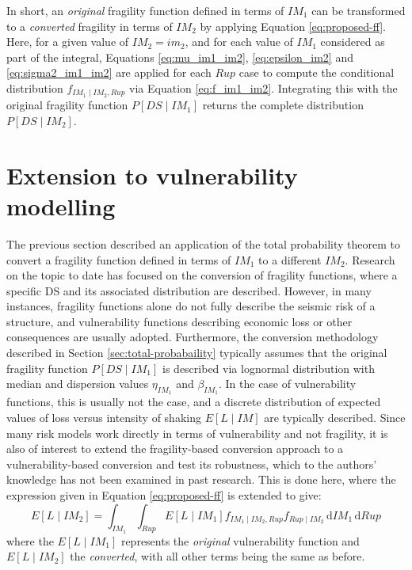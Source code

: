 In short, an \textit{original} fragility function defined in terms of $IM_1$ can be transformed to a \textit{converted} fragility in terms of $IM_2$ by applying Equation \eqref{eq:proposed-ff}. Here, for a given value of $IM_2=im_2$, and for each value of $IM_1$ considered as part of the integral, Equations \eqref{eq:mu_im1_im2}, \eqref{eq:epsilon_im2} and \eqref{eq:sigma2_im1_im2} are applied for each $Rup$ case to compute the conditional distribution $f_{IM_1\mid  IM_2, Rup}$ via Equation \eqref{eq:f_im1_im2}. Integrating this with the original fragility function $P[DS \mid IM_1]$ returns the complete distribution $P[DS \mid IM_2]$.


\section{Extension to vulnerability modelling}\label{sec:vuln-conversion}
The previous section described an application of the total probability theorem to convert a fragility function defined in terms of $IM_1$ to a different $IM_2$. Research on the topic to date has focused on the conversion of fragility functions, where a specific \ac{DS} and its associated distribution are described. However, in many instances, fragility functions alone do not fully describe the seismic risk of a structure, and vulnerability functions describing economic loss or other consequences are usually adopted. Furthermore, the conversion methodology described in Section \ref{sec:total-probabaility} typically assumes that the original fragility function $P[DS \mid IM_1]$ is described via lognormal distribution with median and dispersion values $\eta_{IM_1}$ and $\beta_{IM_1}$. In the case of vulnerability functions, this is usually not the case, and a discrete distribution of expected values of loss versus intensity of shaking $E[L\mid IM]$ are typically described. Since many risk models work directly in terms of vulnerability and not fragility, it is also of interest to extend the fragility-based conversion approach to a vulnerability-based conversion and test its robustness, which to the authors' knowledge has not been examined in past research. This is done here, where the expression given in Equation \eqref{eq:proposed-ff} is extended to give:
\begin{equation}\label{eq:proposed-vf}
    E[L \mid IM_2] = \int_{IM_1}\int_{Rup} E[L \mid IM_1] f_{IM_1 \mid IM_2, Rup}f_{Rup \mid IM_2} \, \mathrm{d}IM_1 \, \mathrm{d}Rup
\end{equation}
where the $E[L \mid IM_1]$ represents the \textit{original} vulnerability function and $E[L \mid IM_2]$ the \textit{converted}, with all other terms being the same as before.


